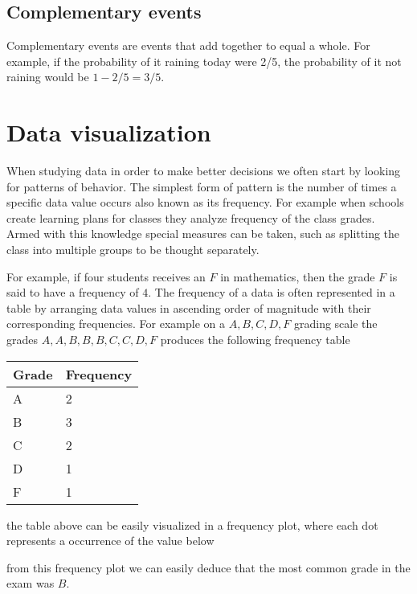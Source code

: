 \subsection{Complementary events}
Complementary events are events that add together to equal a whole. For example, if the probability of it raining today were 2/5, the probability of it not raining would be $1 - 2/5 = 3/5$.

\section{Data visualization}
When studying data in order to make better decisions we often start by looking for patterns of behavior. The simplest form of pattern is the number of times a specific data value occurs also known as its frequency. For example when schools create learning plans for classes they analyze frequency of the class grades. Armed with this knowledge special measures can be taken, such as splitting the class into multiple groups to be thought separately.

For example, if four students receives an $F$ in mathematics, then the grade $F$ is said to have a frequency of $4$. The frequency of a data is often represented in a table by arranging data values in ascending order of magnitude with their corresponding frequencies. For example on a $A, B, C, D, F$ grading scale the grades $A, A, B, B, B, C, C, D, F$ produces the following frequency table
\begin{table}[H]
\centering
\begin{tabular}{|l|l|}
\hline
\textbf{Grade} & \textbf{Frequency} \\ \hline
A              & 2                  \\ \hline
B              & 3                  \\ \hline
C              & 2                  \\ \hline
D              & 1                  \\ \hline
F              & 1                  \\ \hline
\end{tabular}
\end{table}
the table above can be easily visualized in a frequency plot, where each dot represents a occurrence of the value below
\begin{figure}[H]
\centering
{}
\end{figure}
from this frequency plot we can easily deduce that the most common grade in the exam was $B$.

